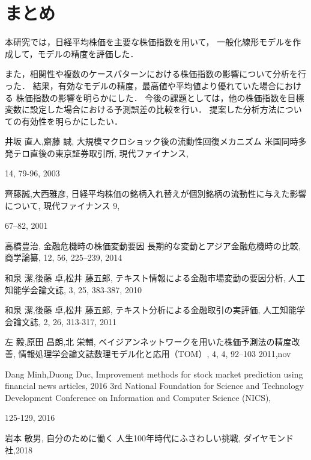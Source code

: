 \documentclass[submit,techrep,noauthor]{ipsj}
\begin{document}
\section{まとめ}
\vspace{-1.0zh}
本研究では，日経平均株価を主要な株価指数を用いて，
一般化線形モデルを作成して，モデルの精度を評価した．

\newpage
また，相関性や複数のケースパターンにおける株価指数の影響について分析を行った．
%
結果，有効なモデルの精度，最高値や平均値より優れていた場合における
株価指数の影響を明らかにした．
%
今後の課題としては，他の株価指数を目標変数に設定した場合における予測誤差の比較を行い．
提案した分析方法についての有効性を明らかにしたい．

\vspace{-1.0zh}
\begin{thebibliography}{10}
井坂 直人,齋藤 誠,
大規模マクロショック後の流動性回復メカニズム 米国同時多発テロ直後の東京証券取引所,
現代ファイナンス,

14,
79-96,
2003

齊藤誠,大西雅彦,
日経平均株価の銘柄入れ替えが個別銘柄の流動性に与えた影響について,
現代ファイナンス
9,

67--82,
2001

高橋豊治,
金融危機時の株価変動要因 長期的な変動とアジア金融危機時の比較,
商学論纂,
12,
56,
225--239,
2014

和泉 潔,後藤 卓,松井 藤五郎,
テキスト情報による金融市場変動の要因分析,
人工知能学会論文誌,
3,
25,
383-387,
2010

和泉 潔,後藤 卓,松井 藤五郎,
テキスト分析による金融取引の実評価,
人工知能学会論文誌,
2,
26,
313-317,
2011

左 毅,原田 昌朗,北 栄輔,
ベイジアンネットワークを用いた株価予測法の精度改善,
情報処理学会論文誌数理モデル化と応用（TOM）,
4,
4,
92--103
2011,nov

Dang Minh,Duong Duc,
Improvement methods for stock market prediction using financial news articles,
2016 3rd National Foundation for Science and Technology Development Conference on Information and Computer Science (NICS),


125-129,
2016

岩本 敏男,
自分のために働く 人生100年時代にふさわしい挑戦,
ダイヤモンド社,2018


\end{thebibliography}
\end{document}

